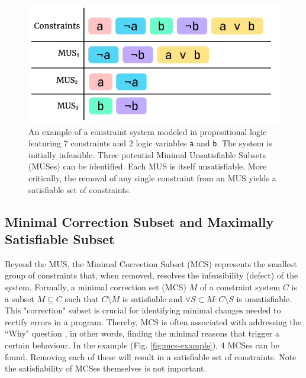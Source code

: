 \begin{figure}[hbt]
  \includegraphics[width=0.8\linewidth]{MUS}
  \caption{
    \label{fig:mus-example}
    An example of a constraint system modeled in propositional logic featuring 7 constraints and 2 logic variables \texttt{a} and \texttt{b}. The system is initially infeasible.  Three potential Minimal Unsatisfiable Subsets (MUSes) can be identified. Each MUS is itself unsatisfiable. More critically, the removal of any single constraint from an MUS yields a satisfiable set of constraints. }
\end{figure}

\subsection{Minimal Correction Subset and Maximally Satisfiable Subset}

Beyond the MUS, the Minimal Correction Subset (MCS) represents the smallest group of constraints that, when removed, resolves the infeasibility (defect) of the system. Formally, a minimal correction set (MCS) $M$ of a constraint system $C$ is a subset $M \subseteq C$ such that $C \setminus M$ is satisfiable and $\forall{S} \subset M : C \setminus S$ is unsatisfiable. This "correction" subset is crucial for identifying minimal changes needed to rectify errors in a program. Thereby, MCS is often associated with addressing the ``Why" question \cite{Ignatiev2020-xu, Nelson2017-ar}, in other words, finding the minimal reasons that trigger a certain behaviour. In the example (Fig. \ref{fig:mcs-example}), 4 MCSes can be found. Removing each of these will result in a satisfiable set of constraints. Note the satisfiability of MCSes themselves is not important.  


